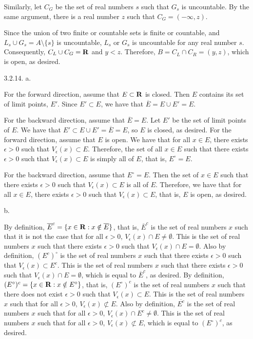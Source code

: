 Similarly, let $C_G$ be the set of real numbers $s$
such that $G_s$ is uncountable.
By the same argument, there is a real number $z$
such that $C_G = (-\infty, z)$.

Since the union of two finite or countable sets is finite or countable,
and $L_s \cup G_s = A \setminus \{s\}$ is uncountable,
$L_s$ or $G_s$ is uncountable for any real number $s$.
Consequently, $C_L \cup C_G = {\bf R}$ and $y < z$.
Therefore, $B = C_L \cap C_R = (y,z)$, which is open, as desired.
\bigskip\goodbreak
\item{3.2.14.} a.

For the forward direction, assume that $E \subset {\bf R}$ is closed.
Then $E$ contains its set of limit points, $E'$.
Since $E' \subset E$, we have that $\overline E = E \cup E' = E$.

For the backward direction, assume that $\overline E = E$.
Let $E'$ be the set of limit points of $E$.
We have that $E' \subset E \cup E' = \overline E = E$,
so $E$ is closed, as desired.
\smallskip
For the forward direction, assume that $E$ is open.
We have that for all $x \in E$,
there exists $\epsilon > 0$ such that $V_\epsilon(x) \subset E$.
Therefore, the set of all $x \in E$ such that
there exists $\epsilon > 0$ such that $V_\epsilon(x) \subset E$
is simply all of $E$, that is, $E^\circ = E$.

For the backward direction, assume that $E^\circ = E$.
Then the set of $x \in E$ such that
there exists $\epsilon > 0$ such that $V_\epsilon(x) \subset E$
is all of $E$.
Therefore, we have that for all $x \in E$,
there exists $\epsilon > 0$ such that $V_\epsilon(x) \subset E$,
that is, $E$ is open, as desired.
\medskip
\item{} b.

By definition, $\overline E^c =
\{x \in {\bf R} : x \notin \overline E\}$, that is,
$\overline E^c$ is the set of real numbers $x$ such that
it is not the case that for all $\epsilon > 0$,
$V_\epsilon(x) \cap E \ne \emptyset$.
This is the set of real numbers $x$ such that there exists $\epsilon > 0$
such that $V_\epsilon(x) \cap E = \emptyset$.
Also by definition, $(E^c)^\circ$ is the set of real numbers $x$ such that
there exists $\epsilon > 0$ such that $V_\epsilon(x) \subset E^c$.
This is the set of real numbers $x$ such that there exists $\epsilon > 0$
such that $V_\epsilon(x) \cap E = \emptyset$,
which is equal to $\overline E^c$, as desired.
\smallskip
By definition, $(E^\circ)^c =
\{x \in {\bf R} : x \notin E^\circ\}$, that is,
$(E^\circ)^c$ is the set of real numbers $x$ such that
there does not exist $\epsilon > 0$ such that $V_\epsilon(x) \subset E$.
This is the set of real numbers $x$ such that
for all $\epsilon > 0$, $V_\epsilon(x) \not\subset E$.
Also by definition, $\overline{E^c}$ is the set of real numbers $x$ such  that
for all $\epsilon > 0$, $V_\epsilon(x) \cap E^c \ne \emptyset$.
This is the set of real numbers $x$ such that for all $\epsilon > 0$,
$V_\epsilon(x) \not\subset E$,
which is equal to $(E^\circ)^c$, as desired.
\bye
